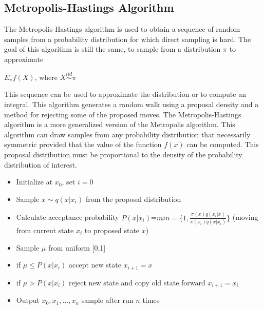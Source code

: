 \documentclass[11pt,a4paper]{article}
\theoremstyle{plain}
\begin{document}
\newpage
\subsection{\bf Metropolis-Hastings Algorithm}
The Metropolis-Hastings algorithm is used to obtain a sequence of random samples from a probability distribution for which direct sampling is hard.
The goal of this algorithm is still the same, to sample from a distribution $\pi$ to approximate
\begin{center}$E_{\pi}f(X)$, where $X\overset{iid}\sim \pi$
\end{center}
This sequence can be used to approximate the distribution or to compute an integral. This algorithm generates a random walk using a proposal density and a method for rejecting some of the proposed moves. The Metropolis-Hastings algorithm is a more generalized version of the Metropolis algorithm. This algorithm can draw samples from any probability distribution that necessarily symmetric provided that the value of the function $f(x)$ can be computed. This proposal distribution must be proportional to the density of the probability distribution of interest.  

\begin{itemize}
  \item Initialize at $x_0$, set $i=0$
  \item Sample $x\sim q(x|x_i)$ from the proposal distribution
  \item Calculate acceptance probability $P(x|x_i)$=$min=\{1,\frac{\pi(x)q(x_i|x)}{\pi(x_i)q(x|x_i)}\}$ 
  \newline(moving from current state $x_i$ to proposed state $x$)
  \item Sample $\mu$ from uniform [0,1]
  \item if $\mu \leq P(x|x_i)$ accept new state $x_{i+1}=x$
  \item if $\mu > P(x|x_i)$ reject new state and copy old state forward $x_{i+1}=x_i$
  \item Output $x_0,x_1,...,x_n$ sample after run $n$ times
\end{itemize}
\newpage
\end{document}
